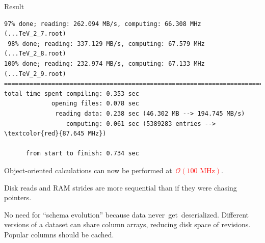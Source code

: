\documentclass{beamer}
\begin{document}
\begin{frame}[fragile]{Result}
\vspace{0.5 cm}
\hspace{-0.75 cm}\begin{minipage}{\linewidth}\scriptsize
\begin{Verbatim}[commandchars=\\\{\}]
 97% done; reading: 262.094 MB/s, computing: 66.308 MHz (...TeV_2_7.root)
 98% done; reading: 337.129 MB/s, computing: 67.579 MHz (...TeV_2_8.root)
100% done; reading: 232.974 MB/s, computing: 67.133 MHz (...TeV_2_9.root)
========================================================================================
total time spent compiling: 0.353 sec
             opening files: 0.078 sec
              reading data: 0.238 sec (46.302 MB --> 194.745 MB/s)
                 computing: 0.061 sec (5389283 entries --> \textcolor{red}{87.645 MHz})

      from start to finish: 0.734 sec
\end{Verbatim}
\end{minipage}

\vspace{1 cm}
Object-oriented calculations can now be performed \mbox{at \textcolor{red}{$\mathcal{O}(\mbox{100 MHz})$}.\hspace{-0.5 cm}}

\vspace{0.25 cm}
Disk reads and RAM strides are more sequential than if they were chasing pointers.

\vspace{0.25 cm}
No need for ``schema evolution'' because data \mbox{never get deserialized.\hspace{-0.25 cm}} Different versions of a dataset can share column arrays, reducing disk space of revisions. Popular columns should be cached.
\end{frame}



\end{document}
